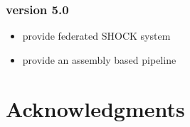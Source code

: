 \documentclass[12pt,fullpage]{report}
\begin{document}
\subsubsection*{version 5.0}
\begin{itemize}
\item provide federated SHOCK system 
\item provide an assembly based pipeline
\end{itemize}
\section*{Acknowledgments}
\end{document}
